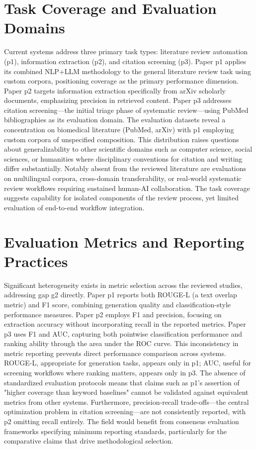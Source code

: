 \documentclass{article}
\begin{document}
\section{Task Coverage and Evaluation Domains}
Current systems address three primary task types: literature review automation (p1), information extraction (p2), and citation screening (p3). Paper p1 applies its combined NLP+LLM methodology to the general literature review task using custom corpora, positioning coverage as the primary performance dimension. Paper p2 targets information extraction specifically from arXiv scholarly documents, emphasizing precision in retrieved content. Paper p3 addresses citation screening—the initial triage phase of systematic review—using PubMed bibliographies as its evaluation domain. The evaluation datasets reveal a concentration on biomedical literature (PubMed, arXiv) with p1 employing custom corpora of unspecified composition. This distribution raises questions about generalizability to other scientific domains such as computer science, social sciences, or humanities where disciplinary conventions for citation and writing differ substantially. Notably absent from the reviewed literature are evaluations on multilingual corpora, cross-domain transferability, or real-world systematic review workflows requiring sustained human-AI collaboration. The task coverage suggests capability for isolated components of the review process, yet limited evaluation of end-to-end workflow integration.

\section{Evaluation Metrics and Reporting Practices}
Significant heterogeneity exists in metric selection across the reviewed studies, addressing gap g2 directly. Paper p1 reports both ROUGE-L (a text overlap metric) and F1 score, combining generation quality and classification-style performance measures. Paper p2 employs F1 and precision, focusing on extraction accuracy without incorporating recall in the reported metrics. Paper p3 uses F1 and AUC, capturing both pointwise classification performance and ranking ability through the area under the ROC curve. This inconsistency in metric reporting prevents direct performance comparison across systems. ROUGE-L, appropriate for generation tasks, appears only in p1; AUC, useful for screening workflows where ranking matters, appears only in p3. The absence of standardized evaluation protocols means that claims such as p1's assertion of "higher coverage than keyword baselines" cannot be validated against equivalent metrics from other systems. Furthermore, precision-recall trade-offs—the central optimization problem in citation screening—are not consistently reported, with p2 omitting recall entirely. The field would benefit from consensus evaluation frameworks specifying minimum reporting standards, particularly for the comparative claims that drive methodological selection.
\end{document}
